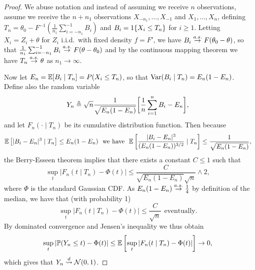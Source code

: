 \begin{proof}
  We abuse notation and instead of assuming we receive $n$ observations, assume
  we receive the $n + n_1$ observations $X_{-n_1}, \ldots, X_{-1}$ and
  $X_1, \ldots, X_n$, defining $T_n = \theta_0 - F^{-1}(\frac{1}{n_1}
  \sum_{i = -n_1}^{-1} B_i)$ and
  $B_i = 1\!\left\{X_i \le T_n\right\}$ for $i \ge 1$.
  Letting $X_i = Z_i + \theta$ for $Z_i$ i.i.d.\ with fixed density
  $f = F'$, we have
  $B_i \stackrel{a.s.}{\rightarrow} F(\theta_0 - \theta)$, so that
  $\frac{1}{n_1} \sum_{i = -n_1}^{-1} B_i \stackrel{a.s.}{\rightarrow} F(\theta - \theta_0)$ and
  by the continuous
  mapping theorem we have $T_n \stackrel{a.s.}{\rightarrow} \theta$ as $n_1 \to \infty$.

  Now let
  $E_n = \mathbb{E}[B_i \mid T_n] = P(X_i \le T_n)$,
  so that $\textup{Var}(B_i \mid T_n) = E_n(1 - E_n)$. Define also the random
  variable
  \begin{equation*}
    Y_n \triangleq \sqrt{n}
    \frac{1}{\sqrt{E_n (1 - E_n)}}
    \bigg[\frac{1}{n}\sum_{i = 1}^n B_i - E_n\bigg],
  \end{equation*}
  and let $F_n(\cdot \mid T_n)$ be its cumulative distribution function.
  Then because
  \begin{equation*}
    \mathbb{E}\left[|B_i - E_n|^3 \mid T_n\right] \le E_n(1 - E_n)
    ~~ \mbox{we have} ~~
    \mathbb{E}\left[\frac{|B_i - E_n|^3}{(E_n(1 - E_n))^{3/2}} \mid T_n\right]
    \le \frac{1}{\sqrt{E_n(1 - E_n)}},
  \end{equation*}
  the Berry-Esseen theorem implies that there exists a constant
  $C \le 1$ such that
  \begin{equation*}
    \sup_t \left|F_n(t \mid T_n) - \Phi(t) \right|
    \le \frac{C}{\sqrt{E_n (1 - E_n)} \sqrt{n}} \wedge 2,
  \end{equation*}
  where $\Phi$ is the standard Gaussian CDF.
  As $E_n (1 - E_n) \stackrel{a.s.}{\rightarrow} \frac{1}{4}$ by definition of the median,
  we have
  that (with probability 1)
  \begin{equation*}
    \sup_t \left|F_n(t \mid T_n) - \Phi(t)\right| \le \frac{C}{\sqrt{n}}
    ~~ \mbox{eventually}.
  \end{equation*}
  By dominated convergence and Jensen's inequality we thus obtain
  \begin{equation*}
    \sup_t \left|\mathbb{P}(Y_n \le t) - \Phi(t)\right|
    \le \mathbb{E}\left[
      \sup_t \left|F_n(t \mid T_n) - \Phi(t)\right| \right]
    \to 0,
  \end{equation*}
  which gives that $Y_n \stackrel{d}{\rightsquigarrow} \mathcal{N}(0, 1)$.


\end{proof}
